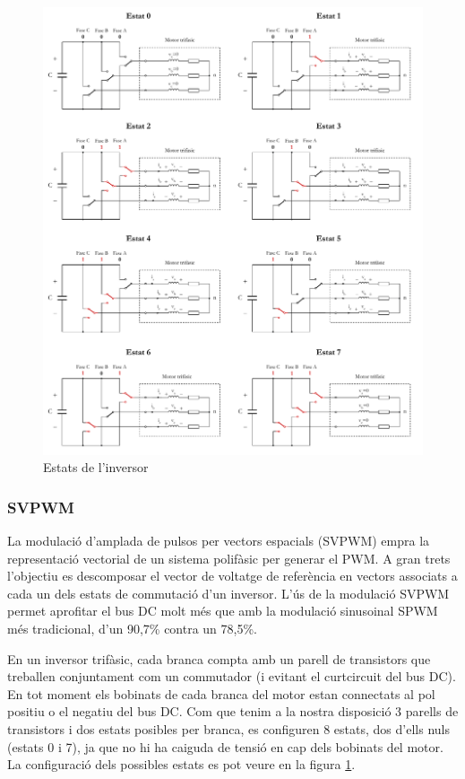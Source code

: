 {    \begin{figure}[!htb]
        \centering
        \captionsetup{justification=centering,margin=1.5cm}
        \includegraphics[width=14.5cm]
            { img/3_control_motor/states_inverter.pdf }
        \caption[Estats de l'inversor]
            { Estats de l'inversor}
        \label{estats}
    \end{figure}

    \newpage
    \subsubsection{ SVPWM } 
    { 
        La modulació d'amplada de pulsos per vectors espacials (SVPWM) empra la
        representació vectorial de un sistema polifàsic per generar el PWM. A
        gran trets l'objectiu es descomposar el vector de voltatge de
        referència en vectors associats a cada un dels estats de commutació
        d'un inversor. L'ús de la modulació SVPWM permet aprofitar el bus
        DC molt més que amb la modulació sinusoinal SPWM més tradicional, d'un
        90,7\% contra un 78,5\%.

        En un inversor trifàsic, cada branca compta amb un parell de
        transistors que treballen conjuntament com un commutador (i evitant el
        curtcircuit del bus DC). En tot moment els bobinats de cada branca del
        motor estan connectats al pol positiu o el negatiu del bus DC. Com que
        tenim a la nostra disposició 3 parells de transistors i dos estats
        posibles per branca, es configuren 8 estats, dos d'ells nuls (estats 0
        i 7), ja que no hi ha caiguda de tensió en cap dels bobinats del motor.
        La configuració dels possibles estats es pot veure en la figura
        \ref{estats}.

}}

